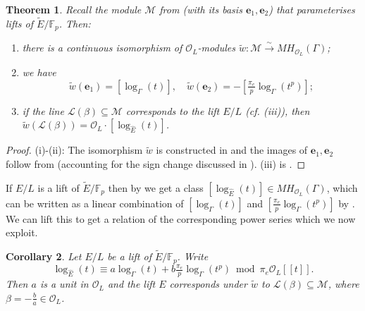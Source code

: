 \documentclass{amsart}
\newtheorem{theorem}{Theorem}
\newtheorem{corollary}[theorem]{Corollary}
\theoremstyle{definition}
\newcommand{\isom}{\tilde{w}}
\numberwithin{theorem}{section}
\numberwithin{equation}{section}
\begin{document}
\begin{theorem}\label{thm: MH iso}
Recall the module $\mathcal{M}$ from  (with its basis $\mathbf{e}_1,\mathbf{e}_2$) that parameterises lifts of $\tilde{E}/\mathbb{F}_p$. Then:
\begin{enumerate}
    \item there is a continuous isomorphism of $\mathcal{O}_L$-modules $\tilde{w}: \mathcal{M} \xrightarrow{\sim} MH_{\mathcal{O}_L}(\Gamma)$;
    \item we have
    \[
    \tilde{w}(\mathbf{e}_1)=[\log_\Gamma(t)], \quad \tilde{w}(\mathbf{e}_2)= -[\tfrac{\pi_e}{p}\log_\Gamma(t^p)];
    \]
    \item if the line $\mathcal{L}(\beta) \subseteq \mathcal{M}$ corresponds to the lift $E/L$ (cf. (iii)), then $\tilde{w}(\mathcal{L}(\beta))=\mathcal{O}_L \cdot [\log_{\hat E}(t)]$.
\end{enumerate}
\end{theorem}

\begin{proof}
(i)-(ii): The isomorphism $\isom$ is constructed in \cite[Lemma 2.2.3 and top of p.~699]{Kawachi} and the images of $\mathbf{e}_1, \mathbf{e}_2$ follow from \cite[Lemma 2.2.2]{Kawachi} (accounting for the sign change discussed in ). (iii) is \cite[Lemma 2.2.4]{Kawachi}.
\end{proof}

If $E/L$ is a lift of $\tilde{E}/\mathbb{F}_p$ then by  we get a class $[\log_{\hat{E}}(t)] \in MH_{\mathcal{O}_L}(\Gamma)$, which can be written as a linear combination of $[\log_\Gamma(t)]$ and $[\tfrac{\pi_e}{p}\log_{\Gamma}(t^p)]$ by . We can lift this to get a relation of the corresponding power series which we now exploit.


\begin{corollary}\label{cor: linear combination formal logarithms}
Let $E/L$ be a lift of $\tilde{E}/\mathbb{F}_p$. Write
\begin{equation}\label{eq: formal log rel}
    \log_{\hat{E}}(t) \equiv a\log_{\Gamma}(t) + b\tfrac{\pi_e}{p}\log_{\Gamma}(t^p) \bmod{\pi_e\mathcal{O}_L[[t]]}.
\end{equation}
Then $a$ is a unit in $\mathcal{O}_L$ and the lift $E$ corresponds under $\tilde{w}$ to $\mathcal{L}(\beta) \subseteq \mathcal{M}$, where $\beta=-\frac{b}{a} \in \mathcal{O}_L$.
\end{corollary}
\end{document}

